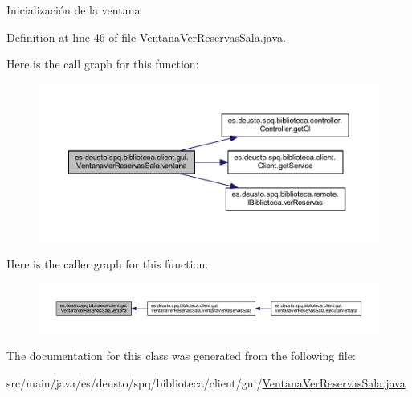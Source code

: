 Inicialización de la ventana 

Definition at line 46 of file Ventana\+Ver\+Reservas\+Sala.\+java.

Here is the call graph for this function\+:
\nopagebreak
\begin{figure}[H]
\begin{center}
\leavevmode
\includegraphics[width=350pt]{classes_1_1deusto_1_1spq_1_1biblioteca_1_1client_1_1gui_1_1_ventana_ver_reservas_sala_a0530d61d6fe002ba70b7a520c5cec330_cgraph}
\end{center}
\end{figure}
Here is the caller graph for this function\+:
\nopagebreak
\begin{figure}[H]
\begin{center}
\leavevmode
\includegraphics[width=350pt]{classes_1_1deusto_1_1spq_1_1biblioteca_1_1client_1_1gui_1_1_ventana_ver_reservas_sala_a0530d61d6fe002ba70b7a520c5cec330_icgraph}
\end{center}
\end{figure}


The documentation for this class was generated from the following file\+:\begin{DoxyCompactItemize}
\item 
src/main/java/es/deusto/spq/biblioteca/client/gui/\mbox{\hyperlink{_ventana_ver_reservas_sala_8java}{Ventana\+Ver\+Reservas\+Sala.\+java}}\end{DoxyCompactItemize}
